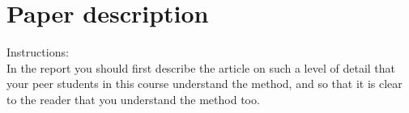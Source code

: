 \section{Paper description}
Instructions:\\
In the report you should first describe the article on such a level of detail that your peer students in this course understand the method, and so that it is clear to the reader that you understand the method too.

